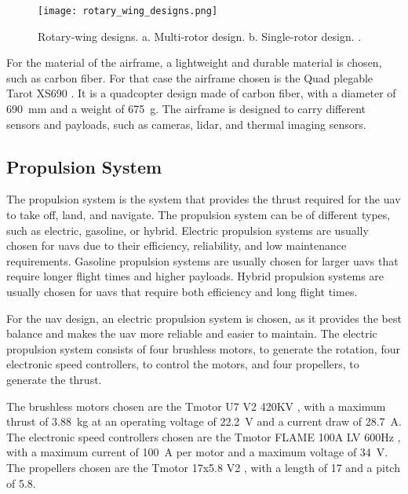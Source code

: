 \begin{figure}
  \texttt{[image: rotary\_wing\_designs.png]}
  \caption{Rotary-wing designs. a. Multi-rotor design. b. Single-rotor design. \autocite{rotary_wing_designs}.}\label{fig:rotary_wing_designs}
\end{figure}

For the material of the airframe, a lightweight and durable material is chosen, such as carbon fiber. For that case the airframe chosen is the Quad plegable Tarot XS690 \autocite{rcinnovationsQuadPlegable}. It is a quadcopter design made of carbon fiber, with a diameter of \SI{690}{\milli\meter} and a weight of \SI{675}{\gram}. The airframe is designed to carry different sensors and payloads, such as cameras, lidar, and thermal imaging sensors.

\subsection{Propulsion System}\label{subsec:design_propulsion_system}

The propulsion system is the system that provides the thrust required for the \gls{uav} to take off, land, and navigate. The propulsion system can be of different types, such as electric, gasoline, or hybrid. Electric propulsion systems are usually chosen for \glspl{uav} due to their efficiency, reliability, and low maintenance requirements. Gasoline propulsion systems are usually chosen for larger \glspl{uav} that require longer flight times and higher payloads. Hybrid propulsion systems are usually chosen for \glspl{uav} that require both efficiency and long flight times.

For the \gls{uav} design, an electric propulsion system is chosen, as it provides the best balance and makes the \gls{uav} more reliable and easier to maintain. The electric propulsion system consists of four brushless motors, to generate the rotation, four electronic speed controllers, to control the motors, and four propellers, to generate the thrust.

The brushless motors chosen are the Tmotor U7 V2 420KV \autocite{rcinnovationsTmotor420KV}, with a maximum thrust of \SI{3.88}{\kilo\gram} at an operating voltage of \SI{22.2}{\volt} and a current draw of \SI{28.7}{\ampere}. The electronic speed controllers chosen are the Tmotor FLAME 100A LV 600Hz \autocite{rcinnovationsVariadorTmotor}, with a maximum current of \SI{100}{\ampere} per motor and a maximum voltage of \SI{34}{\volt}. The propellers chosen are the Tmotor 17x5.8 V2 \autocite{rcinnovationsTmotor17x58}, with a length of \SI{17}{\inch} and a pitch of \SI{5.8}{\inch}.


